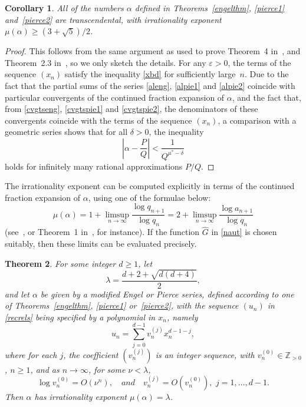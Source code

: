 \documentclass[10pt, a4paper]{amsart}
\numberwithin{equation}{section}
\newcommand\la{\lambda}
\newcommand\al{{\alpha}}
\newcommand\eps{\varepsilon}
\theoremstyle{plain}
\newtheorem{thm}{Theorem}[section]
\newtheorem{cor}[thm]{Corollary}
\theoremstyle{definition}
\newcommand{\Zp}{\mathbb{Z}_{>0}}
\begin{document}
\begin{cor} 
All of the numbers $\al$ defined in Theorems~\ref{engelthm}, 
\ref{pierce1} and~\ref{pierce2} are transcendental, with irrationality 
exponent $\mu(\al)\geq (3+\sqrt{5})/2$. 
\end{cor} 

\begin{proof} 
This follows from the same argument  as used to prove Theorem~4
in~\cite{Hone1}, and  Theorem~2.3 in~\cite{Hone3}, so we only sketch the details. 
For any $\eps>0$, the terms of the sequence $(x_n)$ satisfy the inequality 
\eqref{xbd} for sufficiently large~$n$. 
Due to the fact that the partial sums 
of the series \eqref{aleng}, \eqref{alpie1} and \eqref{alpie2} coincide with 
particular convergents of the continued fraction expansion of $\al$, 
and the fact that, from \eqref{cvgtseng}, \eqref{cvgtspie1} and \eqref{cvgtspie2}, 
the denominators of these convergents coincide with the terms 
of the sequence $(x_n)$,  a comparison with a geometric series 
shows that for all $\delta>0$, the inequality 
\[ 
\left|\al -\frac{P}{Q}\right| < \frac{1}{Q^{\mu^*-\delta}}
\]  
holds for infinitely many rational approximations $P/Q$.
\end{proof} 

The irrationality exponent can be computed explicitly in terms of 
the continued fraction expansion of $\al$, using one of the formulae below: 
\begin{equation}
\label{limsup} 
\mu(\al) = 1+ \limsup\limits_{n\rightarrow\infty} \frac{\log q_{n+1}}{\log q_n} 
=2+\limsup\limits_{n\rightarrow\infty} \frac{\log a_{n+1}}{\log q_n} 
\end{equation} 
(see~\cite{bugeaudetal}, or Theorem~1 in~\cite{sondow}, for instance).
If the function $\widehat{G}$ in \eqref{naut} is chosen suitably, 
then these limits can be evaluated precisely.

\begin{thm} 
For some integer $d\geq 1$, let 
\begin{equation}
\label{las}
\la = \frac{d+2+\sqrt{d(d+4)}}{2},
\end{equation} 
and let $\al$ be given by a modified Engel or Pierce series, defined according to one 
of Theorems~\ref{engelthm}, 
\ref{pierce1} or~\ref{pierce2}, with the sequence $(u_n)$ in \eqref{recrels} 
being specified by a polynomial in $x_n$, namely 
\begin{equation} 
\label{un} 
u_n = \sum_{j=0}^{d-1} v_n^{(j)} x_n^{d-1-j},
\end{equation} 
where for each $j$, the coefficient $(v_n^{(j)})$ is an integer sequence, with 
$ v_n^{(0)}\in \Zp$, $n\geq 1$, and as $n\to\infty$, for some $\nu<\la$, 
\begin{equation}
\label{vbds} 
\log v_n^{(0)}=O(\nu^n),  \quad and \quad v_n^{(j)}=O( v_n^{(0)}), \,\, j=1,\ldots, d-1.
\end{equation}  
Then $\al$ has irrationality exponent $\mu(\al)=\la$. 
\end{thm}
\end{document}
